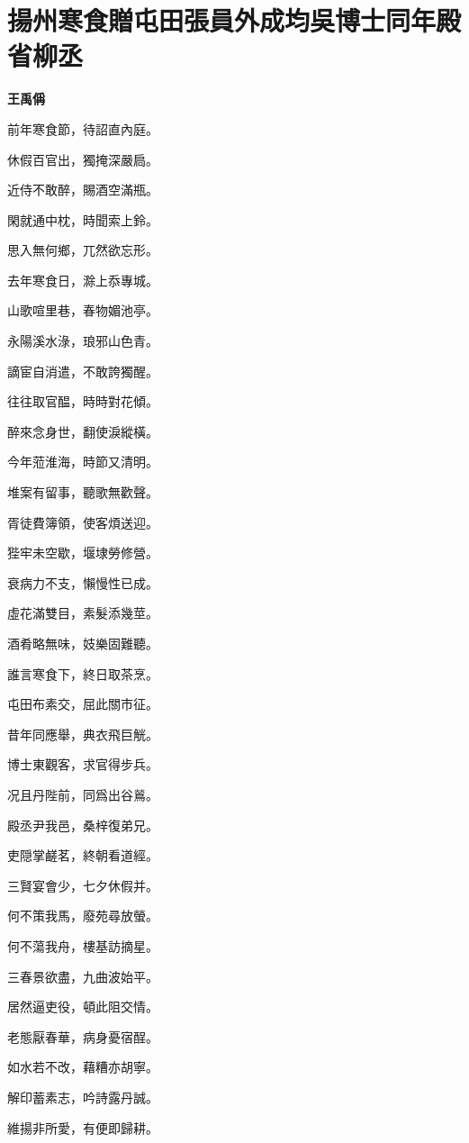 \documentclass[12pt,a4paper]{ctexbook}
\begin{document}
\section{揚州寒食贈屯田張員外成均吳博士同年殿省柳丞}
\textbf{王禹偁}\par\vspace{0.5em}
前年寒食節，待詔直內庭。\par
休假百官出，獨掩深嚴扃。\par
近侍不敢醉，賜酒空滿瓶。\par
閑就通中枕，時聞索上鈴。\par
思入無何鄉，兀然欲忘形。\par
去年寒食日，滁上忝專城。\par
山歌喧里巷，春物媚池亭。\par
永陽溪水淥，琅邪山色青。\par
謫宦自消遣，不敢誇獨醒。\par
往往取官醖，時時對花傾。\par
醉來念身世，翻使淚縱橫。\par
今年蒞淮海，時節又清明。\par
堆案有留事，聽歌無歡聲。\par
胥徒費簿領，使客煩送迎。\par
狴牢未空歇，堰埭勞修營。\par
衰病力不支，懶慢性已成。\par
虛花滿雙目，素髮添幾莖。\par
酒肴略無味，妓樂固難聽。\par
誰言寒食下，終日取茶烹。\par
屯田布素交，屈此關市征。\par
昔年同應舉，典衣飛巨觥。\par
博士東觀客，求官得步兵。\par
况且丹陛前，同爲出谷鶑。\par
殿丞尹我邑，桑梓復弟兄。\par
吏隠掌鹺茗，終朝看道經。\par
三賢宴會少，七夕休假并。\par
何不策我馬，廢苑尋放螢。\par
何不蕩我舟，樓基訪摘星。\par
三春景欲盡，九曲波始平。\par
居然逼吏役，頓此阻交情。\par
老態厭春華，病身憂宿酲。\par
如水若不改，藉糟亦胡寧。\par
解印蓄素志，吟詩露丹誠。\par
維揚非所愛，有便即歸耕。\par
\end{document}
